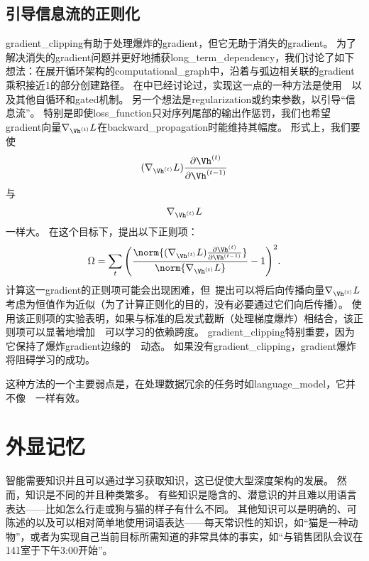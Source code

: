 \subsection{引导信息流的正则化}
\label{sec:regularizing_to_encourage_information_flow}
\gls{gradient_clipping}有助于处理爆炸的\gls{gradient}，但它无助于消失的\gls{gradient}。
为了解决消失的\gls{gradient}问题并更好地捕获\gls{long_term_dependency}，我们讨论了如下想法：在展开循环架构的\gls{computational_graph}中，沿着与弧边相关联的\gls{gradient}乘积接近1的部分创建路径。
在中已经讨论过，实现这一点的一种方法是使用~~以及其他自循环和\gls{gated}机制。
另一个想法是\gls{regularization}或约束参数，以引导``信息流''。
特别是即使\gls{loss_function}只对序列尾部的输出作惩罚，我们也希望\gls{gradient}向量$\nabla_{\Vh^{(t)}} L$在\gls{backward_propagation}时能维持其幅度。
形式上，我们要使
\begin{align}
 (\nabla_{\Vh^{(t)}} L) \frac{\partial \Vh^{(t)}}{\partial \Vh^{(t-1)}}
\end{align}
与
\begin{align}
\nabla_{\Vh^{(t)}} L 
\end{align}
一样大。
在这个目标下，\citet{Pascanu+al-ICML2013-small}提出以下正则项：
\begin{align}
 \Omega = \sum_t \Bigg(  \frac{
 \norm{ (\nabla_{\Vh^{(t)}} L) \frac{\partial \Vh^{(t)}}{\partial \Vh^{(t-1)}}}}
 {\norm{\nabla_{\Vh^{(t)}} L}} -1 \Bigg)^2.
\end{align}
计算这一\gls{gradient}的正则项可能会出现困难，但~\cite{Pascanu+al-ICML2013-small}提出可以将后向传播向量$\nabla_{\Vh^{(t)}} L$考虑为恒值作为近似（为了计算正则化的目的，没有必要通过它们向后传播）。
使用该正则项的实验表明，如果与标准的启发式截断（处理梯度爆炸）相结合，该正则项可以显著地增加~~可以学习的依赖跨度。
\gls{gradient_clipping}特别重要，因为它保持了爆炸\gls{gradient}边缘的~~动态。
如果没有\gls{gradient_clipping}，\gls{gradient}爆炸将阻碍学习的成功。

这种方法的一个主要弱点是，在处理数据冗余的任务时如\gls{language_model}，它并不像~~一样有效。


\section{外显记忆}
\label{sec:explicit_memory}
智能需要知识并且可以通过学习获取知识，这已促使大型深度架构的发展。
然而，知识是不同的并且种类繁多。
有些知识是隐含的、潜意识的并且难以用语言表达——比如怎么行走或狗与猫的样子有什么不同。
其他知识可以是明确的、可陈述的以及可以相对简单地使用词语表达——每天常识性的知识，如``猫是一种动物''，或者为实现自己当前目标所需知道的非常具体的事实，如``与销售团队会议在141室于下午3:00开始''。


